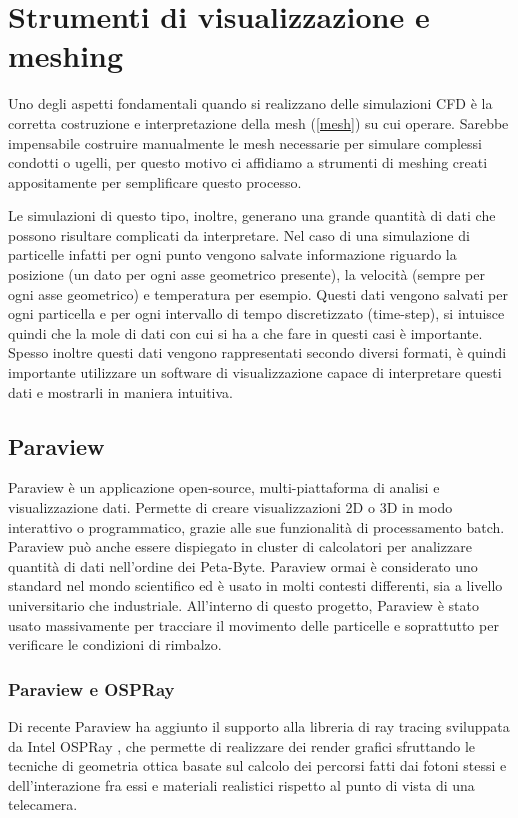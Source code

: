 \section{Strumenti di visualizzazione e meshing}\label{visualizzazione}
Uno degli aspetti fondamentali quando si realizzano delle simulazioni CFD è la corretta costruzione e interpretazione della mesh (\ref*{mesh}) su cui operare.
Sarebbe impensabile costruire manualmente le mesh necessarie per simulare complessi condotti o ugelli, per questo motivo ci affidiamo a strumenti di meshing creati appositamente
per semplificare questo processo.

Le simulazioni di questo tipo, inoltre, generano una grande quantità di dati che possono risultare complicati da interpretare.
Nel caso di una simulazione di particelle infatti per ogni punto vengono salvate informazione riguardo
la posizione (un dato per ogni asse geometrico presente), la velocità (sempre per ogni asse geometrico) e temperatura per esempio.
Questi dati vengono salvati per ogni particella e per ogni intervallo di tempo discretizzato (time-step), si intuisce quindi
che la mole di dati con cui si ha a che fare in questi casi è importante.
Spesso inoltre questi dati vengono rappresentati secondo diversi formati, è quindi importante utilizzare un software di visualizzazione
capace di interpretare questi dati e mostrarli in maniera intuitiva.

    \subsection{Paraview}\label{paraview}
    Paraview è un applicazione open-source, multi-piattaforma di analisi e visualizzazione dati. Permette di creare
    visualizzazioni 2D o 3D in modo interattivo o programmatico, grazie alle sue funzionalità di processamento
    batch. Paraview può anche essere dispiegato in cluster di calcolatori per analizzare quantità di dati nell'ordine dei
    Peta-Byte. Paraview ormai è considerato uno standard nel mondo scientifico ed è usato in molti contesti differenti,
    sia a livello universitario che industriale.
    All'interno di questo progetto, Paraview è stato usato massivamente per tracciare il movimento delle particelle e soprattutto
    per verificare le condizioni di rimbalzo.

        \subsubsection{Paraview e OSPRay}\label{raytracing}
        Di recente Paraview ha aggiunto il supporto alla libreria di ray tracing sviluppata da Intel OSPRay \cite{WaldI2017O-AC}, che permette
        di realizzare dei render grafici sfruttando le tecniche di geometria ottica basate sul calcolo dei percorsi fatti dai fotoni stessi e
        dell'interazione fra essi e materiali realistici rispetto al punto di vista di una telecamera.
        
